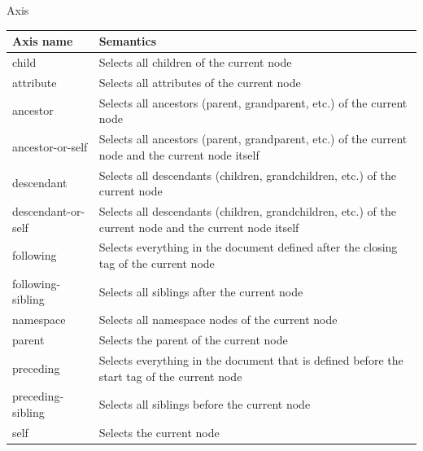 \begin{frame}{Axis \cite{w3c/xpath}}

\begin{tabular}{| l | p{8cm} |}
\hline
Axis name & Semantics \\
\hline
\hline
child & Selects all children of the current node \\
\hline
attribute & Selects all attributes of the current node \\
\hline
ancestor & Selects all ancestors (parent, grandparent, etc.) of the current node \\
\hline
ancestor-or-self & Selects all ancestors (parent, grandparent, etc.) of the current node and the current node itself \\
\hline
descendant & Selects all descendants (children, grandchildren, etc.) of the current node \\
\hline
descendant-or-self & Selects all descendants (children, grandchildren, etc.) of the current node and the current node itself \\
\hline
following & Selects everything in the document defined after the closing tag of the current node \\
\hline
following-sibling & Selects all siblings after the current node \\
\hline
namespace & Selects all namespace nodes of the current node \\
\hline
parent & Selects the parent of the current node \\
\hline
preceding & Selects everything in the document that is defined before the start tag of the current node \\
\hline
preceding-sibling & Selects all siblings before the current node \\
\hline
self & Selects the current node \\
\hline
\end{tabular}

\end{frame}



